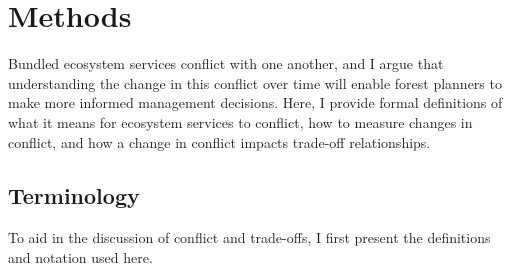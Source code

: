 \section{Methods}
\label{sec:methods}
%
%

Bundled ecosystem services conflict with one another, and I argue that understanding the change in this conflict over time will enable forest planners to make more informed management decisions. Here, I provide formal definitions of what it means for ecosystem services to conflict, how to measure changes in conflict, and how a change in conflict impacts trade-off relationships.

\subsection{Terminology}
To aid in the discussion of conflict and trade-offs, I first present the definitions and notation used here.%

\label{subsec:terminology}
